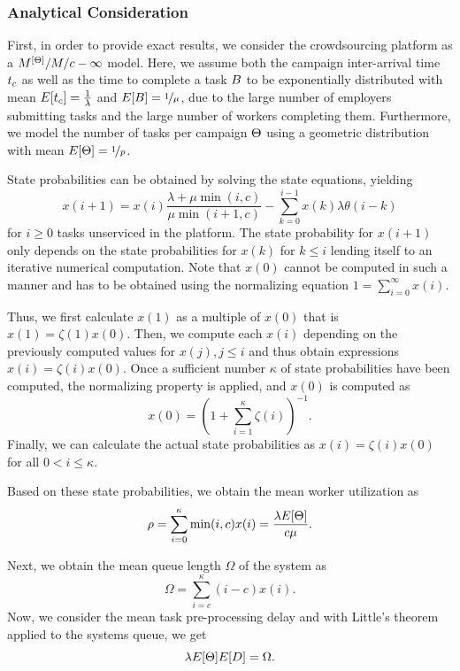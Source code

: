\subsubsection*{Analytical Consideration}

First, in order to provide exact results, we consider the crowdsourcing platform as a \(M^{[\Theta]}/M/c-\infty\) model.
Here, we assume both the campaign inter-arrival time \(t_c\) as well as the time to complete a task \(B\) to be exponentially distributed with mean \(E[t_c] = \frac{1}{\lambda}\) and \(E[B] = \nicefrac{1}{\mu}\), due to the large number of employers submitting tasks and the large number of workers completing them.
Furthermore, we model the number of tasks per campaign \(\Theta\) using a geometric distribution with mean \(E[\Theta] = \nicefrac{1}{p}\).

State probabilities\cite{Kleinrock1975} can be obtained by solving the state equations, yielding
\[
x(i + 1) = x(i) \frac{\lambda + \mu \min(i, c)}{\mu \min(i + 1, c)} - \sum_{k=0}^{i-1} x(k) \lambda \theta(i - k)
\]
for \(i \geq 0\) tasks unserviced in the platform.
The state probability for \(x(i+1)\) only depends on the state probabilities for \(x(k)\) for \(k \leq i\) lending itself to an iterative numerical computation.
Note that \(x(0)\) cannot be computed in such a manner and has to be obtained using the normalizing equation \(1 = \sum_{i=0}^{\infty} x(i)\).

Thus, we first calculate \(x(1)\) as a multiple of \(x(0)\) that is \(x(1) = \zeta(1) x(0)\).
Then, we compute each \(x(i)\) depending on the previously computed values for \(x(j), j \leq i\) and thus obtain expressions \(x(i) = \zeta(i) x(0)\).  
Once a sufficient number \(\kappa\) of state probabilities have been computed, the normalizing property is applied, and \(x(0)\) is computed as
\[
	x(0) = \left(1 + \sum_{i = 1}^\kappa \zeta(i)\right)^{-1}.
\]
Finally, we can calculate the actual state probabilities as \(x(i) = \zeta(i) x(0)\) for all \(0 < i \leq \kappa\).

Based on these state probabilities, we obtain the mean worker utilization as
\[
\rho = \sum_{i=0}^{\kappa} \min(i, c) x(i) = \frac{\lambda E[\Theta]}{c\mu}. 
\]

Next, we obtain the mean queue length \(\Omega\) of the system as
\[
	\Omega = \sum_{i = c}^\kappa (i - c) x(i).
\]
Now, we consider the mean task pre-processing delay and with Little's theorem applied to the systems queue, we get
\[\lambda E[\Theta] E[D] = \Omega.\]

